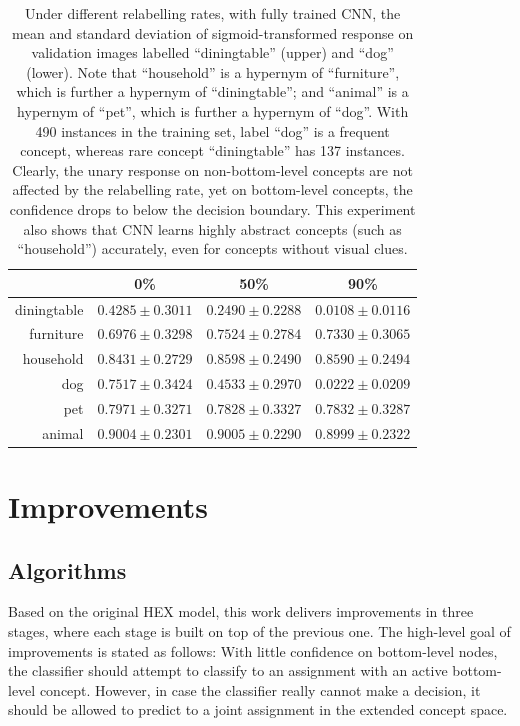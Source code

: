 \documentclass[11pt,a4paper]{article}
\begin{document}
\begin{table}[htbp]
\centering
\begin{tabular}{r|c|c|c}
 & 0\% & 50\% & 90\%\\
\hline
diningtable & $0.4285\pm0.3011$ & $0.2490\pm0.2288$ & $0.0108\pm0.0116$\\
furniture   & $0.6976\pm0.3298$ & $0.7524\pm0.2784$ & $0.7330\pm0.3065$\\
household   & $0.8431\pm0.2729$ & $0.8598\pm0.2490$ & $0.8590\pm0.2494$\\
\hline
dog         & $0.7517\pm0.3424$ & $0.4533\pm0.2970$ & $0.0222\pm0.0209$\\
pet         & $0.7971\pm0.3271$ & $0.7828\pm0.3327$ & $0.7832\pm0.3287$\\
animal      & $0.9004\pm0.2301$ & $0.9005\pm0.2290$ & $0.8999\pm0.2322$
\end{tabular}
\caption{Under different relabelling rates, with fully trained CNN, the mean and standard deviation of sigmoid-transformed response on validation images labelled ``diningtable'' (upper) and ``dog'' (lower). Note that ``household'' is a hypernym of ``furniture'', which is further a hypernym of ``diningtable''; and ``animal'' is a hypernym of ``pet'', which is further a hypernym of ``dog''. With 490 instances in the training set, label ``dog'' is a frequent concept, whereas rare concept ``diningtable'' has 137 instances. Clearly, the unary response on non-bottom-level concepts are not affected by the relabelling rate, yet on bottom-level concepts, the confidence drops to below the decision boundary.  This experiment also shows that CNN learns highly abstract concepts (such as ``household'') accurately, even for concepts without visual clues.}
\label{tab:resp}
\end{table}

\clearpage
\section{Improvements}
\subsection{Algorithms}

Based on the original HEX model, this work delivers improvements in three stages, where each stage is built on top of the previous one. The high-level goal of improvements is stated as follows: With little confidence on bottom-level nodes, the classifier should attempt to classify to an assignment with an active bottom-level concept. However, in case the classifier really cannot make a decision, it should be allowed to predict to a joint assignment in the extended concept space.
\end{document}
